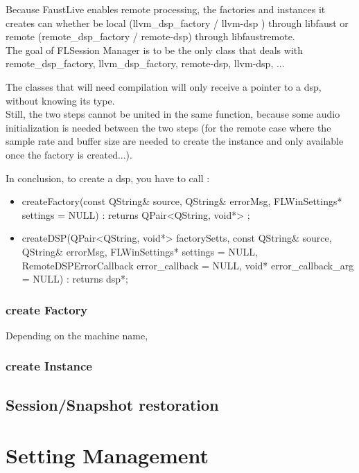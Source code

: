 \documentclass[a4paper]{article}
\begin{document}
Because FaustLive enables remote processing, the factories and instances it creates can whether be local (llvm\_dsp\_factory / llvm-dsp ) through libfaust or remote (remote\_dsp\_factory / remote-dsp) through libfaustremote. \\

The goal of FLSession Manager is to be the only class that deals with remote\_dsp\_factory, llvm\_dsp\_factory, remote-dsp, llvm-dsp, ...

The classes that will need compilation will only receive a pointer to a dsp, without knowing its type. \\

Still, the two steps cannot be united in the same function, because some audio initialization is needed between the two steps (for the remote case where the sample rate and buffer size are needed to create the instance and only available once the factory is created...).

In conclusion, to create a dsp, you have to call :
\begin{itemize}
\item createFactory(const QString\& source, QString\& errorMsg, FLWinSettings* settings = NULL) : returns QPair<QString, void*> ;
\item createDSP(QPair<QString, void*> factorySetts, const QString\& source, QString\& errorMsg, FLWinSettings* settings = NULL, RemoteDSPErrorCallback error\_callback = NULL, void* error\_callback\_arg = NULL) : returns dsp*;
\end{itemize}

\subsubsection{create Factory}

Depending on the machine name, 

\subsubsection{create Instance}

\subsection{Session/Snapshot restoration}

\section{Setting Management}
\end{document}
